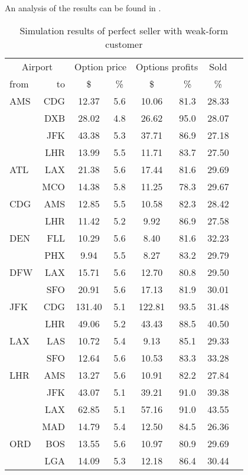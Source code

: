 An analysis of the results can be found in .
\\[2em]
\begin{table}[h]
    \small
    \begin{center}
        \begin{tabular}{l r c c c c c c}
            \toprule
            \multicolumn{2}{c}{Airport}  & \multicolumn{2}{c}{Option price} & \multicolumn{2}{c}{Options profits}  &  Sold  \\[.4ex]
            from  &  to  &  \$  & \%  &  \$  & \%  & \%  \\
            \midrule
AMS  &  CDG &  12.37  &    5.6  &  10.06  &   81.3  &  28.33  \\
     &  DXB &  28.02  &    4.8  &  26.62  &   95.0  &  28.07  \\
     &  JFK &  43.38  &    5.3  &  37.71  &   86.9  &  27.18  \\
     &  LHR &  13.99  &    5.5  &  11.71  &   83.7  &  27.50  \\[.5ex]
ATL  &  LAX &  21.38  &    5.6  &  17.44  &   81.6  &  29.69  \\
     &  MCO &  14.38  &    5.8  &  11.25  &   78.3  &  29.67  \\[.5ex]
CDG  &  AMS &  12.85  &    5.5  &  10.58  &   82.3  &  28.42  \\
     &  LHR &  11.42  &    5.2  &   9.92  &   86.9  &  27.58  \\[.5ex]
DEN  &  FLL &  10.29  &    5.6  &   8.40  &   81.6  &  32.23  \\
     &  PHX &   9.94  &    5.5  &   8.27  &   83.2  &  29.79  \\[.5ex]
DFW  &  LAX &  15.71  &    5.6  &  12.70  &   80.8  &  29.50  \\
     &  SFO &  20.91  &    5.6  &  17.13  &   81.9  &  30.01  \\[.5ex]
JFK  &  CDG &  131.40  &    5.1  &  122.81  &   93.5  &  31.48  \\
     &  LHR &  49.06  &    5.2  &  43.43  &   88.5  &  40.50  \\[.5ex]
LAX  &  LAS &  10.72  &    5.4  &   9.13  &   85.1  &  29.33  \\
     &  SFO &  12.64  &    5.6  &  10.53  &   83.3  &  33.28  \\[.5ex]
LHR  &  AMS &  13.27  &    5.6  &  10.91  &   82.2  &  27.84  \\
     &  JFK &  43.07  &    5.1  &  39.21  &   91.0  &  39.38  \\
     &  LAX &  62.85  &    5.1  &  57.16  &   91.0  &  43.55  \\
     &  MAD &  14.79  &    5.4  &  12.50  &   84.5  &  26.36  \\[.5ex]
ORD  &  BOS &  13.55  &    5.6  &  10.97  &   80.9  &  29.69  \\
     &  LGA &  14.09  &    5.3  &  12.18  &   86.4  &  30.44  \\
        \end{tabular}
        \caption{Simulation results of perfect seller with weak-form customer}
        \label{tbl:resultsBS}
    \end{center}
\end{table}





